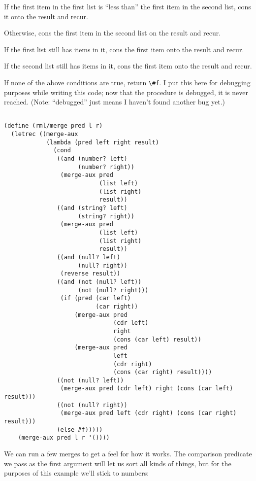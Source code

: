 \documentclass[12pt,openright,draft]{book}
\begin{document}
If the first item in the first list is ``less than'' the first item in the second list, cons it onto the result and recur.

Otherwise, cons the first item in the second list on the result and recur.

If the first list still has items in it, cons the first item onto the result and recur.

If the second list still has items in it, cons the first item onto the result and recur.

If none of the above conditions are true, return \verb|\#f|. I put
this here for debugging purposes while writing this code; now that the
procedure is debugged, it is never reached. (Note: ``debugged'' just
means I haven't found another bug yet.)

\begin{verbatim}

(define (rml/merge pred l r)
  (letrec ((merge-aux
            (lambda (pred left right result)
              (cond
               ((and (number? left)
                     (number? right))
                (merge-aux pred
                           (list left)
                           (list right)
                           result))
               ((and (string? left)
                     (string? right))
                (merge-aux pred
                           (list left)
                           (list right)
                           result))
               ((and (null? left)
                     (null? right))
                (reverse result))
               ((and (not (null? left))
                     (not (null? right)))
                (if (pred (car left)
                          (car right))
                    (merge-aux pred
                               (cdr left)
                               right
                               (cons (car left) result))
                    (merge-aux pred
                               left
                               (cdr right)
                               (cons (car right) result))))
               ((not (null? left))
                (merge-aux pred (cdr left) right (cons (car left) result)))
               ((not (null? right))
                (merge-aux pred left (cdr right) (cons (car right) result)))
               (else #f)))))
    (merge-aux pred l r '())))

\end{verbatim}

We can run a few merges to get a feel for how it works. The comparison predicate we pass as the first argument will let us sort all kinds of things, but for the purposes of this example we'll stick to numbers:
\end{document}
